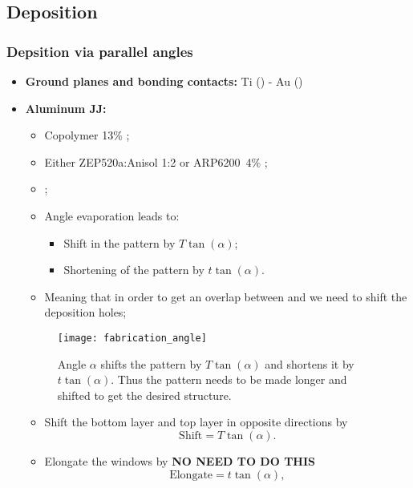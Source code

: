 \newpage\subsection{Deposition}
\label{sec:deposition}

\subsubsection{Depsition via parallel angles}
\label{sec:deps-via-parall}


\begin{itemize}
\item \textbf{Ground planes and  bonding contacts:} Ti ()
  - Au ()
\item \textbf{Aluminum JJ:}
  \begin{itemize}
  \item Copolymer 13\% \hfill {};
  \item  Either ZEP520a:Anisol  1:2  or ARP6200\  4\%  \hfill {};
  \item {};
  \item Angle evaporation leads to:
    \begin{itemize}
    \item Shift in the pattern by $ T\tan(\alpha) $;
    \item Shortening of the pattern by $ t\tan(\alpha) $.
    \end{itemize}
  \item Meaning that  in order to get an overlap  between  and
     we need to shift the deposition holes;
  \end{itemize}
  \begin{figure}[h]
    \centering \texttt{[image: fabrication\_angle]}
    \caption{\small    Angle   $\alpha$    shifts   the    pattern   by
      $ T\tan(\alpha)  $ and shortens  it by  $ t\tan(\alpha).$ Thus  the pattern
      needs  to  be  made  longer   and  shifted  to  get  the  desired
      structure. \label{fig:fabrication_angle}}
  \end{figure}
  \begin{itemize}
  \item Shift the bottom layer and top layer in opposite directions by
    \begin{equation}
      \label{eq:jj_overlap}
      \text{Shift} = T\tan(\alpha).
    \end{equation}
  \item  Elongate  the windows    by
    \hfill \textbf{NO NEED TO DO THIS}
    \begin{equation}
      \label{eq:jj_elongate}
      \text{Elongate} = t\tan(\alpha),
    \end{equation}
  \end{itemize}
\end{itemize}
